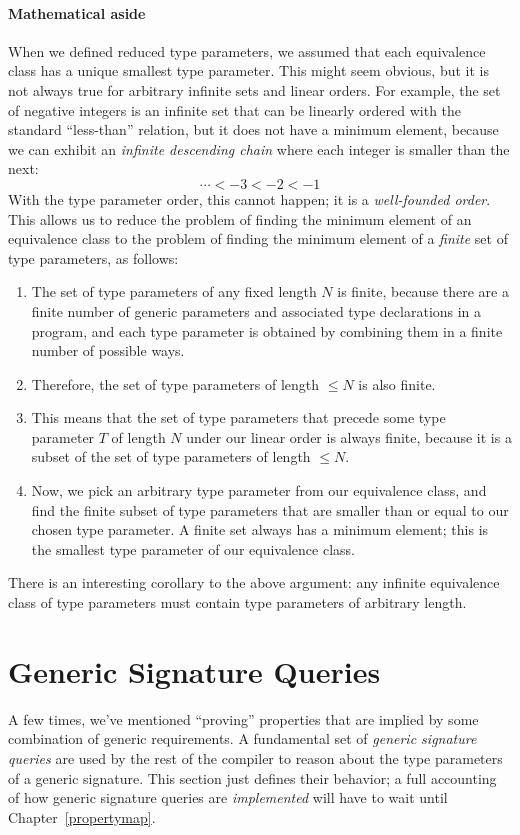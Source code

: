 \documentclass[a4paper,headsepline,bibliography=totoc,toc=flat,fleqn,twoside=semi]{scrbook}
\theoremstyle{definition}
\theoremstyle{definition}
\theoremstyle{definition}
\begin{document}
\paragraph{Mathematical aside} When we defined reduced type parameters, we assumed that each equivalence class has a unique smallest type parameter. This might seem obvious, but it is not always true for arbitrary infinite sets and linear orders. For example, the set of negative integers is an infinite set that can be linearly ordered with the standard ``less-than'' relation, but it does not have a minimum element, because we can exhibit an \emph{infinite descending chain} where each integer is smaller than the next:
\[\cdots < -3 < -2 < -1\]
With the type parameter order, this cannot happen; it is a \emph{well-founded order}. This allows us to reduce the problem of finding the minimum element of an equivalence class to the problem of finding the minimum element of a \emph{finite} set of type parameters, as follows:
\begin{enumerate}
\item The set of type parameters of any fixed length $N$ is finite, because there are a finite number of generic parameters and associated type declarations in a program, and each type parameter is obtained by combining them in a finite number of possible ways.
\item Therefore, the set of type parameters of length $\leq N$ is also finite.
\item This means that the set of type parameters that precede some type parameter $T$ of length $N$ under our linear order is always finite, because it is a subset of the set of type parameters of length $\leq N$.
\item Now, we pick an arbitrary type parameter from our equivalence class, and find the finite subset of type parameters that are smaller than or equal to our chosen type parameter. A finite set always has a minimum element; this is the smallest type parameter of our equivalence class.
\end{enumerate}
There is an interesting corollary to the above argument: any infinite equivalence class of type parameters must contain type parameters of arbitrary length.

\section{Generic Signature Queries}\label{genericsigqueries}
A few times, we've mentioned ``proving'' properties that are implied by some combination of generic requirements. A fundamental set of \emph{generic signature queries} are used by the rest of the compiler to reason about the type parameters of a generic signature. This section just defines their behavior; a full accounting of how generic signature queries are \emph{implemented} will have to wait until Chapter~\ref{propertymap}.
\end{document}

